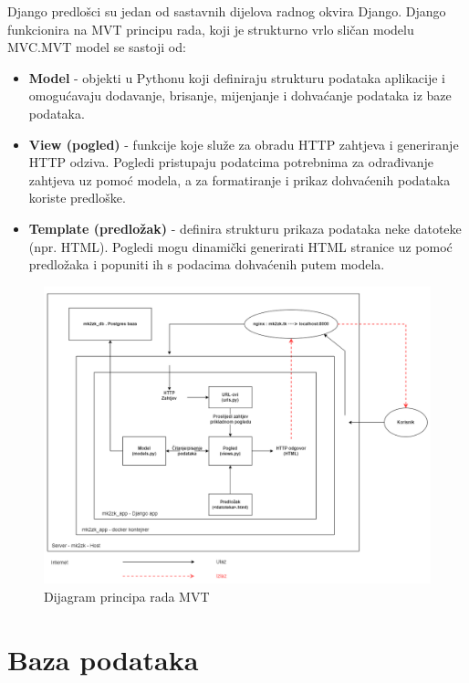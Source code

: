 		Django predlošci su jedan od sastavnih dijelova radnog okvira Django. Django funkcionira na MVT principu rada, koji je strukturno vrlo sličan modelu MVC.\newline MVT model se sastoji od:
\begin{itemize}
		\item 	\textbf{Model} - objekti u Pythonu koji definiraju strukturu podataka aplikacije i omogućavaju dodavanje, brisanje, mijenjanje i dohvaćanje podataka iz baze podataka.
		\item 	\textbf{View (pogled)} - funkcije koje služe za obradu HTTP zahtjeva i generiranje HTTP odziva. Pogledi pristupaju podatcima potrebnima za odrađivanje zahtjeva uz pomoć modela, a za formatiranje i prikaz  dohvaćenih podataka koriste predloške.
		\item 	\textbf{Template (predložak)} - definira strukturu prikaza podataka neke datoteke (npr. HTML). Pogledi mogu dinamički generirati HTML stranice uz pomoć predložaka i popuniti ih s podacima dohvaćenih putem modela. 
				
	\end{itemize}

		\begin{figure}[H]
						\includegraphics[scale=0.6]{dijagrami/django_mvt.png} 
						\centering
						\caption{Dijagram principa rada MVT}
						\label{fig:dijagramRadaMVT}
					\end{figure}

		

				
		\section{Baza podataka}
			
